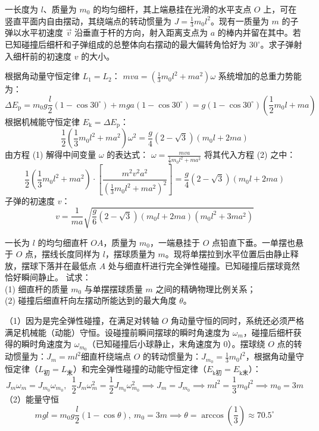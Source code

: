 \documentclass[lang=cn,11pt]{elegantbook}
\begin{document}
\begin{example}
一长度为 $l$、质量为 $m_0$ 的均匀细杆，其上端悬挂在光滑的水平支点 $O$ 上，可在竖直平面内自由摆动，其绕端点的转动惯量为 $J = \frac{1}{3}m_0 l^2$。现有一质量为 $m$ 的子弹以水平初速度 $\vec{v}$ 沿垂直于杆的方向，射入距离支点为 $a$ 的棒内并留在其中。若已知碰撞后细杆和子弹组成的总整体向右摆动的最大偏转角恰好为 $30^\circ$。求子弹射入细杆前的初速度 $v$ 的大小。
\end{example}
\begin{solution}
根据角动量守恒定律 $L_1 = L_2$： \(m v a = \left( \frac{1}{3}m_0 l^2 + m a^2 \right) \omega\) 
系统增加的总重力势能为：$$\Delta E_{\text{p}} = m_0 g \frac{l}{2}(1 - \cos 30^\circ) + m g a (1 - \cos 30^\circ) = g(1 - \cos 30^\circ) \left( \frac{1}{2}m_0 l + m a \right)$$根据机械能守恒定律 $E_{\text{k}} = \Delta E_{\text{p}}$：$$\frac{1}{2}\left( \frac{1}{3}m_0 l^2 + m a^2 \right)\omega^2 = \frac{g}{4}(2 - \sqrt{3})(m_0 l + 2ma)$$
由方程 (1) 解得中间变量 $\omega$ 的表达式： \(\omega = \frac{m v a}{\frac{1}{3}m_0 l^2 + m a^2}\) 将其代入方程 (2) 之中：$$\frac{1}{2}\left( \frac{1}{3}m_0 l^2 + m a^2 \right) \cdot \left[ \frac{m^2 v^2 a^2}{\left(\frac{1}{3}m_0 l^2 + m a^2\right)^2} \right] = \frac{g}{4}(2 - \sqrt{3})(m_0 l + 2ma)$$子弹的初速度 $v$：$$\boxed{v = \frac{1}{ma}\sqrt{\frac{g}{6}(2 - \sqrt{3})(m_0 l + 2ma)(m_0 l^2 + 3ma^2)}}$$
\end{solution}

\begin{example}
一长为 $l$ 的均匀细直杆 $OA$，质量为 $m_0$，一端悬挂于 $O$ 点铅直下垂。一单摆也悬于 $O$ 点，摆线长度同样为 $l$，摆球质量为 $m$。现将单摆拉到水平位置后由静止释放，摆球下落并在最低点 $A$ 处与细直杆进行完全弹性碰撞。已知碰撞后摆球竟然恰好瞬间静止。
试求：\\
(1) 细直杆的质量 $m_0$ 与单摆摆球质量 $m$ 之间的精确物理比例关系；\\
(2) 碰撞后细直杆向左摆动所能达到的最大角度 $\theta$。
\end{example}
\begin{solution}
（1）因为是完全弹性碰撞，在满足对转轴 $O$ 角动量守恒的同时，系统还必须严格满足机械能（动能）守恒。设碰撞前瞬间摆球的瞬时角速度为 $\omega_m$，碰撞后细杆获得的瞬时角速度为 $\omega_{m_0}$（已知碰撞后小球静止，末角速度为 0）。摆球绕 $O$ 点的转动惯量为：$J_m = ml^2$细直杆绕端点 $O$ 的转动惯量为：$J_{m_0} = \frac{1}{3}m_0 l^2$，根据角动量守恒定律（$L_{\text{初}} = L_{\text{末}}$）和完全弹性碰撞的动能守恒定律（$E_{\text{k}\text{初}} = E_{\text{k}\text{末}}$）：
$$J_m \omega_m = J_{m_0} \omega_{m_0},~~\frac{1}{2}J_m \omega_m^2 = \frac{1}{2}J_{m_0} \omega_{m_0}^2 \implies J_m = J_{m_0}\implies ml^2 = \frac{1}{3}m_0 l^2\implies m_0=3m$$
（2）能量守恒$$mgl = m_0 g \frac{l}{2}(1 - \cos\theta),~m_0=3m\implies\theta = \arccos\left(\frac{1}{3}\right) \approx 70.5^\circ$$
\end{solution}
\end{document}

